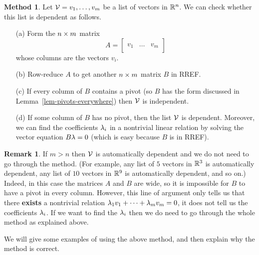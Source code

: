 \documentclass[reqno]{amsart}
\theoremstyle{definition}
\newtheorem{remark}[theorem]{Remark}
\newtheorem{method}[theorem]{Method}
\begin{document}
\begin{method}\label{meth-check-dependence}
 Let $\mathcal{V}=v_1,\dotsc,v_m$ be a list of vectors in ${\mathbb{R}}^n$.  We can
 check whether this list is dependent as follows.
 \begin{itemize}
  \item[(a)] Form the $n\times m$ matrix
   \[ A = \left[\begin{array}{c|c|c}
              && \\
              v_1 & \dotsc & v_m \\
              &&
            \end{array}\right]
   \]
   whose columns are the vectors $v_i$.
  \item[(b)] Row-reduce $A$ to get another $n\times m$ matrix $B$ in
   RREF.
  \item[(c)] If every column of $B$ contains a pivot (so $B$ has the
   form discussed in Lemma~\ref{lem-pivots-everywhere}) then $\mathcal{V}$ is
   independent.
  \item[(d)] If some column of $B$ has no pivot, then the list $\mathcal{V}$
   is dependent.  Moreover, we can find the coefficients $\lambda_i$ in a
   nontrivial linear relation by solving the vector equation $B\lambda=0$
   (which is easy because $B$ is in RREF).
 \end{itemize}
\end{method}
\begin{remark}\label{rem-dependence-shortcut}
 If $m>n$ then $\mathcal{V}$ is automatically dependent and we do not need to
 go through the method.  (For example, any list of $5$ vectors in
 ${\mathbb{R}}^3$ is automatically dependent, any list of $10$ vectors in ${\mathbb{R}}^9$
 is automatically dependent, and so on.)  Indeed, in this case the
 matrices $A$ and $B$ are wide, so it is impossible for $B$ to have a
 pivot in every column.  However, this line of argument only tells us
 that there \textbf{exists} a nontrivial relation
 $\lambda_1v_1+\dotsb+\lambda_mv_m=0$, it does not tell us the coefficients
 $\lambda_i$.  If we want to find the $\lambda_i$ then we do need to go
 through the whole method as explained above.
\end{remark}

We will give some examples of using the above method, and then explain
why the method is correct.
\end{document}
